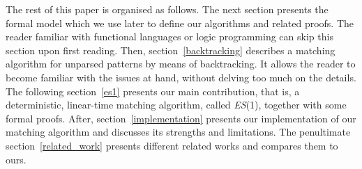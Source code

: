 The rest of this paper is organised as follows. The next section
presents the formal model which we use later to define our algorithms
and related proofs. The reader familiar with functional languages or
logic programming can skip this section upon first reading.  Then,
section~\ref{backtracking} describes a matching algorithm for unparsed
patterns by means of backtracking. It allows the reader to become
familiar with the issues at hand, without delving too much on the
details. The following section~\ref{es1} presents our main
contribution, that is, a deterministic, linear\hyp{}time matching
algorithm, called \textit{ES}(1), together with some formal
proofs. After, section~\ref{implementation} presents our
implementation of our matching algorithm and discusses its strengths
and limitations. The penultimate section~\ref{related_work} presents
different related works and compares them to ours.
